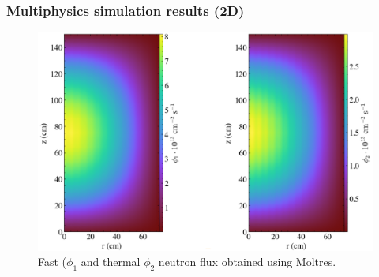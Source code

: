 \begin{frame}
  \frametitle{Multiphysics simulation results (2D)}
  \begin{figure}[t]
   \vspace{-0.05in}
   \hspace*{-0.15in}
   \includegraphics[height=0.85\textheight]{./images/moltres_flux.png}
   \vspace{-0.1in}
   \caption{Fast ($\phi_1$ and thermal $\phi_2$ neutron flux obtained using Moltres.}
    \end{figure}

\end{frame}

